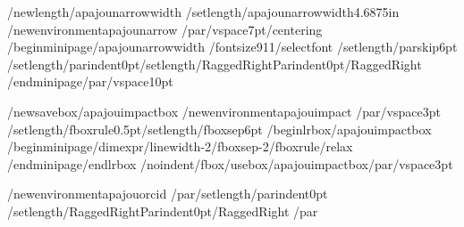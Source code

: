 /newlength{/apajounarrowwidth}
/setlength{/apajounarrowwidth}{4.6875in}
/newenvironment{apajounarrow}
  {/par/vspace{7pt}/centering
   /begin{minipage}{/apajounarrowwidth}%
   /fontsize{9}{11}/selectfont
   /setlength{/parskip}{6pt}%
   /setlength{/parindent}{0pt}/setlength{/RaggedRightParindent}{0pt}/RaggedRight}
  {/end{minipage}/par/vspace{10pt}}

/newsavebox{/apajouimpactbox}
/newenvironment{apajouimpact}
  {/par/vspace{3pt}%
   /setlength{/fboxrule}{0.5pt}/setlength{/fboxsep}{6pt}%
   /begin{lrbox}{/apajouimpactbox}%
   /begin{minipage}{/dimexpr/linewidth-2/fboxsep-2/fboxrule/relax}}
  {/end{minipage}/end{lrbox}%
   /noindent/fbox{/usebox{/apajouimpactbox}}/par/vspace{3pt}}

/newenvironment{apajouorcid}
  {/par/setlength{/parindent}{0pt}%
   /setlength{/RaggedRightParindent}{0pt}/RaggedRight}
  {/par}

